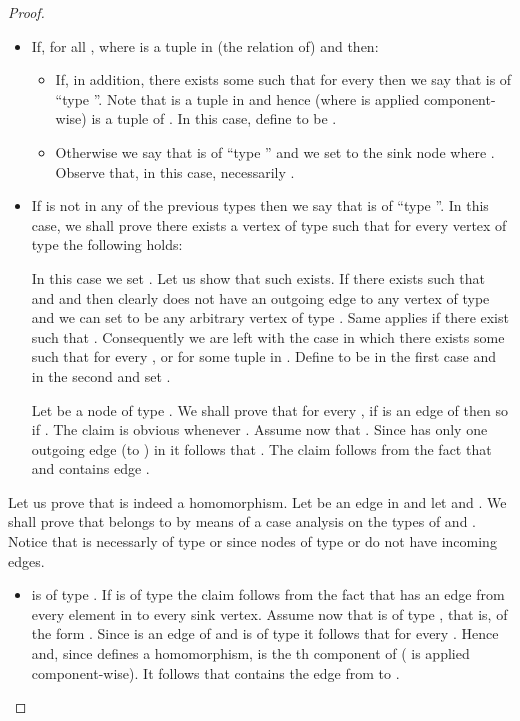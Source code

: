 \documentclass{article}
\begin{document}
\begin{proof}
\begin{itemize}
\item If, for all ,  where  is a tuple in (the relation of) 
and  then:

\begin{itemize}

\item If, in addition, there exists some  such that  for every  then we say that  is of ``type ''.  Note that  is a tuple in 
 and hence  (where  is applied component-wise) is a tuple of . In this case, define  to be .

\item Otherwise we say that  is of ``type '' and we set 
  to the sink node  where . Observe that, in this case, necessarily .

\end{itemize}

\item If  is not in any of the previous types then we say that is of ``type ''. In this case, we shall prove there exists a vertex  of type  such that for 
every vertex  of type  the following holds: 

In this case we set .
Let us show that such  exists. If there exists  such that  and  and  then clearly  does not have an outgoing edge to any vertex of type  and we can set  to be any arbitrary vertex of type . Same applies if there exist  such that . Consequently we are left with the case in which there exists some  such that for every ,  or  for some tuple  in . Define  to be  in the first case and  in the second and set .

Let  be a node of type . We shall prove that for every , if  is an edge of  then so
if . The claim is obvious whenever . 
Assume now that . Since  has only one outgoing edge (to ) in  it follows that 
. The claim follows from the fact that  and  contains edge . 
\end{itemize}




Let us prove that  is indeed a homomorphism. Let  be an edge in  and let  and . We shall prove 
that  belongs to  by means of a case analysis on the types of  and . Notice that  is necessarly of type  or  since nodes of type  or  do not have incoming edges.



\begin{itemize}

\item  is of type . If  is of type  the claim follows from the fact that  has an edge from every element in  to every sink vertex. Assume now that  is of type , that is, of the form .
Since  is an edge of  and  is of type  it follows that
 for every . Hence  and, since  defines a homomorphism, 
 is the th component of  ( is applied component-wise). It follows that  contains the edge from  to
.




\end{itemize}
\end{proof}
\end{document}
